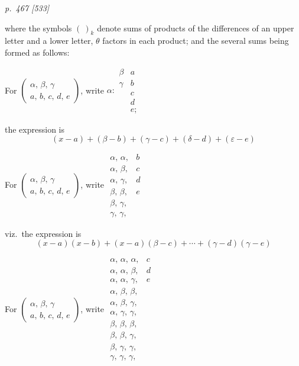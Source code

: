 \documentclass[11pt,a4paper]{book}
\begin{document}
\bigskip
\textit{p.~467 [533]}
\smallskip

\noindent
where the symbols $(\ )_k$ denote sums of products of the differences of an upper letter
and a lower letter, $\theta$ factors in each product; and the several sums being formed as
follows:

For $\begin{pmatrix} \alpha,\,\beta,\,\gamma \\ a,\,b,\,c,\,d,\,e \end{pmatrix}$, write
$\alpha :
\begin{array}{ll}
\beta & a \\
\gamma & b \\
& c \\
& d \\
& e ;
\end{array}$

the expression is
\[
(x-a)+(\beta-b)+(\gamma-c)+(\delta-d)+(\varepsilon-e)
\]

For $\begin{pmatrix} \alpha,\,\beta,\,\gamma \\ a,\,b,\,c,\,d,\,e \end{pmatrix}$, write
$\begin{array}{ll}
\alpha,\,\alpha, & b \\
\alpha,\,\beta, & c \\
\alpha,\,\gamma, & d \\
\beta,\,\beta, & e \\
\beta,\,\gamma, & \\
\gamma,\,\gamma, &
\end{array}$

viz.\ the expression is
\[
(x-a)(x-b)+(x-a)(\beta-c)+\cdots+(\gamma-d)(\gamma-e)
\]

For $\begin{pmatrix} \alpha,\,\beta,\,\gamma \\ a,\,b,\,c,\,d,\,e \end{pmatrix}$, write
$\begin{array}{ll}
\alpha,\,\alpha,\,\alpha, & c \\
\alpha,\,\alpha,\,\beta, & d \\
\alpha,\,\alpha,\,\gamma, & e \\
\alpha,\,\beta,\,\beta, & \\
\alpha,\,\beta,\,\gamma, & \\
\alpha,\,\gamma,\,\gamma, & \\
\beta,\,\beta,\,\beta, & \\
\beta,\,\beta,\,\gamma, & \\
\beta,\,\gamma,\,\gamma, & \\
\gamma,\,\gamma,\,\gamma, &
\end{array}$
\end{document}
